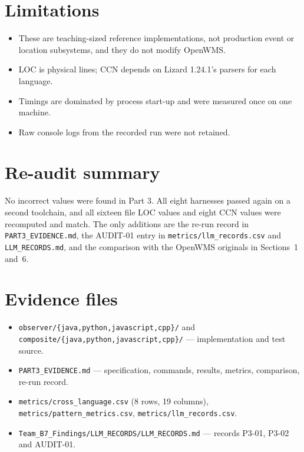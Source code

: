 \documentclass[11pt,a4paper]{article}
\newcommand{\code}[1]{\nolinkurl{#1}}
\begin{document}
\section{Limitations}
\begin{itemize}[nosep]
\item These are teaching-sized reference implementations, not production event or location subsystems, and they do not modify OpenWMS.
\item LOC is physical lines; CCN depends on Lizard 1.24.1's parsers for each language.
\item Timings are dominated by process start-up and were measured once on one machine.
\item Raw console logs from the recorded run were not retained.
\end{itemize}

\section{Re-audit summary}
No incorrect values were found in Part 3. All eight harnesses passed again on a second toolchain, and all sixteen file LOC values and eight CCN values were recomputed and match. The only additions are the re-run record in \code{PART3_EVIDENCE.md}, the AUDIT-01 entry in \code{metrics/llm_records.csv} and \code{LLM_RECORDS.md}, and the comparison with the OpenWMS originals in Sections~1 and~6.

\section{Evidence files}
\begin{itemize}[nosep]
\item \code{observer/\{java,python,javascript,cpp\}/} and \code{composite/\{java,python,javascript,cpp\}/} --- implementation and test source.
\item \code{PART3_EVIDENCE.md} --- specification, commands, results, metrics, comparison, re-run record.
\item \code{metrics/cross_language.csv} (8 rows, 19 columns), \code{metrics/pattern_metrics.csv}, \code{metrics/llm_records.csv}.
\item \code{Team_B7_Findings/LLM_RECORDS/LLM_RECORDS.md} --- records P3-01, P3-02 and AUDIT-01.
\end{itemize}
\end{document}
